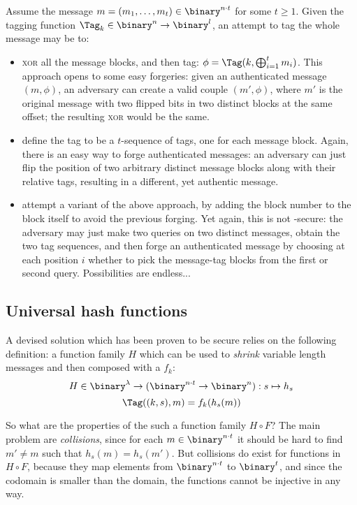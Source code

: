 Assume the message $m = (m_1, \dots, m_t) \in \binary^{n \cdot t}$ for some $t \geq 1$. Given the tagging function $\Tag_k \in \binary^n \to \binary^l$, an attempt to tag the whole message may be to:

\begin{itemize}    
    \item \textsc{xor} all the message blocks, and then tag: $\phi = \Tag(k, \bigoplus_{i = 1}^{t} m_i)$. This approach opens to some easy forgeries: given an authenticated message $(m, \phi)$, an adversary can create a valid couple $(m', \phi)$, where $m'$ is the original message with two flipped bits in two distinct blocks at the same offset; the resulting \textsc{xor} would be the same.

    \item define the tag to be a $t$-sequence of tags, one for each message block. Again, there is an easy way to forge authenticated messages: an adversary can just flip the position of two arbitrary distinct message blocks along with their relative tags, resulting in a different, yet authentic message.

    \item attempt a variant of the above approach, by adding the block number to the block itself to avoid the previous forging. Yet again, this is not \ufcma-secure: the adversary may just make two queries on two distinct messages, obtain the two tag sequences, and then forge an authenticated message by choosing at each position $i$ whether to pick the message-tag blocks from the first or second query. Possibilities are endless...

\end{itemize}

\subsection{Universal hash functions}

A devised solution which has been proven to be secure relies on the following definition: a function family $H$ which can be used to \emph{shrink} variable length messages and then composed with a \prf{} $f_k$:
\[
   H \in \binary^\lambda \to (\binary^{n \cdot t} \to \binary^n) : s \mapsto h_s
\]
\[
    \Tag((k, s), m) = f_k(h_s(m))
\]

So what are the properties of the such a function family $H \circ F$? The main problem are \emph{collisions}, since for each $m \in \binary^{n \cdot t}$ it should be hard to find $m' \neq m$ such that $h_s(m) = h_s(m')$. But collisions do exist for functions in $H \circ F$, because they map elements from $\binary^{n \cdot t} $ to $\binary^t$, and since the codomain is smaller than the domain, the functions cannot be injective in any way.

